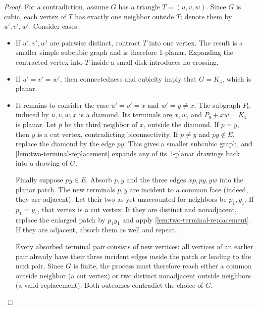 \documentclass[a4paper,11pt]{article}
\theoremstyle{plain}
\theoremstyle{definition}  %
\begin{document}
\begin{proof}
    For a contradiction, assume $G$ has a triangle $T=(u,v,w)$.  Since $G$ is
    cubic, each vertex of $T$ has exactly one neighbor outside $T$; denote
    them by $u',v',w'$. Consider cases.

    \begin{itemize}
        \item If $u',v',w'$ are pairwise distinct, contract $T$ into one
        vertex.  The result is a smaller simple subcubic graph and is therefore
        1-planar.  Expanding the contracted vertex into $T$ inside a small
        disk introduces no crossing.

        \item If $u'=v'=w'$, then connectedness and cubicity imply that
        $G=K_4$, which is planar.

        \item It remains to consider the case $u'=v'=x$ and $w'=y\ne x$.
        The subgraph $P_0$ induced by $u,v,w,x$ is a diamond.  Its terminals
        are $x,w$, and $P_0+xw=K_4$ is planar.  Let $p$ be the third neighbor
        of $x$, outside the diamond.  If $p=y$, then $y$ is a cut vertex,
        contradicting biconnectivity.  If $p\ne y$ and $py\notin E$, replace
        the diamond by the edge $py$.  This gives a smaller subcubic graph,
        and \cref{lem:two-terminal-replacement} expands any of its 1-planar
        drawings back into a drawing of $G$.

        Finally suppose $py\in E$.  Absorb $p,y$ and the three edges
        $xp,py,yw$ into the planar patch.  The new terminals $p,y$ are
        incident to a common face (indeed, they are adjacent).  Let their two
        as-yet unaccounted-for neighbors be $p_1,y_1$.  If $p_1=y_1$, that
        vertex is a cut vertex.  If they are distinct and nonadjacent, replace
        the enlarged patch by $p_1y_1$ and apply
        \cref{lem:two-terminal-replacement}.  If
        they are adjacent, absorb them as well and repeat.

        Every absorbed terminal pair consists of new vertices: all vertices
        of an earlier pair already have their three incident edges inside the
        patch or leading to the next pair.  Since $G$ is finite, the process
        must therefore reach either a common outside neighbor (a cut vertex)
        or two distinct nonadjacent outside neighbors (a valid replacement).
        Both outcomes contradict the choice of $G$.
    \end{itemize}
\end{proof}
\end{document}
